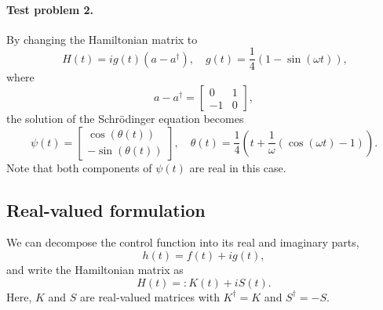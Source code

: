 \documentclass[11pt]{article}
\begin{document}
\paragraph{Test problem 2.}
By changing the Hamiltonian matrix to
\begin{equation}\
H(t) = i g(t) (a - a^\dag),\quad g(t) = \frac{1}{4}\left(1 - \sin(\omega t)\right),
\end{equation}
where
\[
a- a^\dag =
\begin{bmatrix}
  0  & 1\\
  -1 & 0
\end{bmatrix},
\]
the solution of the Schr\"odinger equation becomes
\[
\psi(t) = \begin{bmatrix}
  \cos(\theta(t))\\
  -\sin(\theta(t))
  \end{bmatrix},\quad \theta(t) = \frac{1}{4}\left( t + \frac{1}{\omega}(\cos(\omega t) - 1)\right).
\]
Note that both components of $\psi(t)$ are real in this case.

\subsection{Real-valued formulation}

We can decompose the control function into its real and imaginary parts,
\[
h(t) = f(t) + i g(t),
\]
and write the Hamiltonian matrix as
\[
H(t) =: K(t) + i S(t).
\]
Here, $K$ and $S$ are real-valued matrices with $K^\dag = K$ and $S^\dag = -S$.
\end{document}
